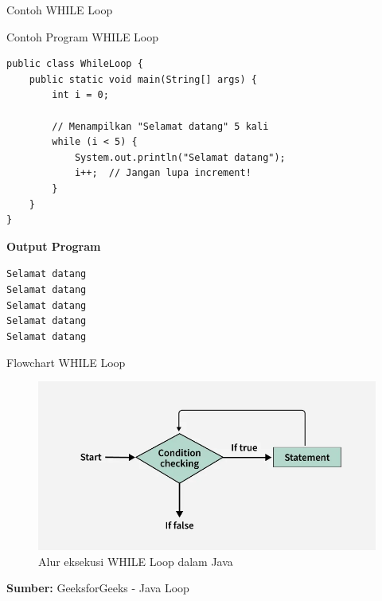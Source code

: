 \documentclass{beamer}
\begin{document}
\begin{frame}[fragile]{Contoh WHILE Loop}
\vspace{-0.2cm}
  \begin{exampleblock}{Contoh Program WHILE Loop}
    \begin{lstlisting}[basicstyle=\ttfamily\scriptsize]
public class WhileLoop {
    public static void main(String[] args) {
        int i = 0;
        
        // Menampilkan "Selamat datang" 5 kali
        while (i < 5) {
            System.out.println("Selamat datang");
            i++;  // Jangan lupa increment!
        }
    }
}
    \end{lstlisting}
  \end{exampleblock}

  \vspace{-0.6cm}
  \textbf{Output Program}
    \colorbox{gray!20}{
      \parbox{0.9\textwidth}{
        {\scriptsize
        \texttt{Selamat datang\\
        Selamat datang\\
        Selamat datang\\
        Selamat datang\\
        Selamat datang}
        }
      }
    }

\end{frame}

\begin{frame}{Flowchart WHILE Loop}
  \begin{figure}
      \centering
      \includegraphics[width=0.75\linewidth]{Perulangan/while_loop_flowchart.png}
      \caption{Alur eksekusi WHILE Loop dalam Java}
      \label{fig:placeholder}
  \end{figure}
  \textbf{Sumber: }GeeksforGeeks - Java Loop
\end{frame}

\end{document}
